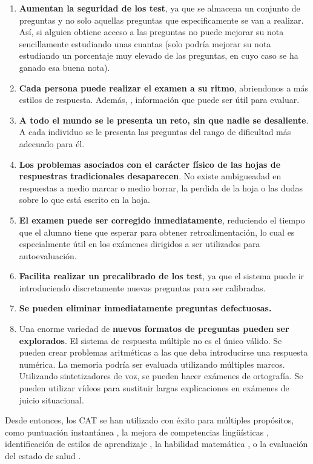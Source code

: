\begin{enumerate}
	\item \textbf{Aumentan la seguridad de los test}, ya que se almacena un conjunto de preguntas y no solo aquellas preguntas que especificamente se van a realizar. Así, si alguien obtiene acceso a las preguntas no puede mejorar su nota sencillamente estudiando unas cuantas (solo podría mejorar su nota estudiando un porcentaje muy elevado de las preguntas, en cuyo caso se ha ganado esa buena nota).
	\item \textbf{Cada persona puede realizar el examen a su ritmo}, abriendonos a más estilos de respuesta. Además, , información que puede ser útil para evaluar.
	\item \textbf{A todo el mundo se le presenta un reto, sin que nadie se desaliente}. A cada individuo se le presenta las preguntas del rango de dificultad más adecuado para él.
	\item \textbf{Los problemas asociados con el carácter físico de las hojas de respuestras tradicionales desaparecen}. No existe ambigueadad en respuestas a medio marcar o medio borrar, la perdida de la hoja o las dudas sobre lo que está escrito en la hoja.
	\item \textbf{El examen puede ser corregido inmediatamente}, reduciendo el tiempo que el alumno tiene que esperar para obtener retroalimentación, lo cual es especialmente útil en los exámenes dirigidos a ser utilizados para autoevaluación.
	\item \textbf{Facilita realizar un precalibrado de los test}, ya que el sistema puede ir introduciendo discretamente nuevas preguntas para ser calibradas.
	\item \textbf{Se pueden eliminar inmediatamente preguntas defectuosas.}
	\item Una enorme variedad de \textbf{nuevos formatos de preguntas pueden ser explorados}. El sistema de respuesta múltiple no es el único válido. Se pueden crear problemas aritméticas a las que deba introducirse una respuesta numérica. La memoria podría ser evaluada utilizando múltiples marcos. Utilizando sintetizadores de voz, se pueden hacer exámenes de ortografía. Se pueden utilizar vídeos para sustituir largas explicaciones en exámenes de juicio situacional.
\end{enumerate}

Desde entonces, los \acrshort{CAT} se han utilizado con éxito para múltiples propósitos, como puntuación instantánea \cite{Wainer00}, la mejora de competencias lingüísticas \cite{Chapelle06} , identificación de estilos de aprendizaje \cite{Ortigosa10}, la habilidad matemática \cite{Klinkenberg11}, o la evaluación del estado de salud \cite{Revicki97}.

